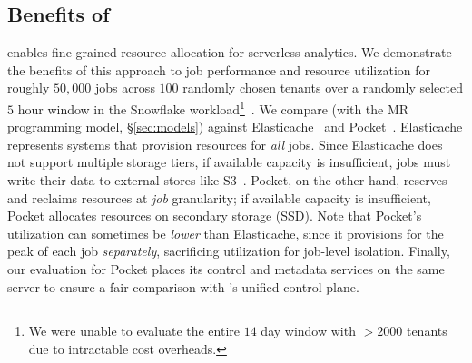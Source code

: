 \subsection{Benefits of \jiffy}
\label{ssec:overallbenefits}

\jiffy enables fine-grained resource allocation for serverless analytics. We demonstrate the benefits of this approach to job performance and resource utilization for roughly $50,000$ jobs across $100$ randomly chosen tenants over a randomly selected $5$ hour window in the Snowflake workload\footnote{{We were unable to evaluate the entire $14$ day window with $>2000$ tenants due to intractable cost overheads.}}~\cite{snowset}. %
%
We compare \jiffy (with the MR programming model, \S\ref{sec:models}) against Elasticache~\cite{elasticache} and Pocket~\cite{pocket}. Elasticache represents systems that provision resources for \textit{all} jobs. Since Elasticache does not support multiple storage tiers, if available capacity is insufficient, jobs must write their data to external stores like S3~\cite{s3}. Pocket, on the other hand, reserves and reclaims resources at \textit{job} granularity; if available capacity is insufficient, Pocket allocates resources on secondary storage (SSD). Note that Pocket's utilization can sometimes be \textit{lower} than Elasticache, since it provisions for the peak of each job \textit{separately}, sacrificing utilization for job-level isolation. Finally, our evaluation for Pocket places its control and metadata services on the same server to ensure a fair comparison with \jiffy's unified control plane.

